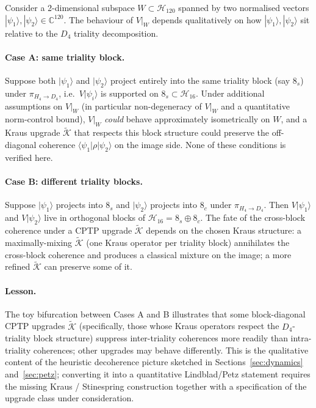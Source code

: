 \documentclass[12pt]{article}
\theoremstyle{definition}
\theoremstyle{remark}
\newcommand{\Hcal}{\mathcal{H}}
\newcommand{\Kcal}{\mathcal{K}}
\begin{document}
Consider a 2-dimensional subspace $W \subset \Hcal_{120}$ spanned by two normalised vectors $|\psi_1\rangle, |\psi_2\rangle \in \mathbb{C}^{120}$. The behaviour of $V|_W$ depends qualitatively on how $|\psi_1\rangle, |\psi_2\rangle$ sit relative to the $D_4$ triality decomposition.

\paragraph{Case A: same triality block.} Suppose both $|\psi_1\rangle$ and $|\psi_2\rangle$ project entirely into the same triality block (say $8_s$) under $\pi_{H_4 \to D_4}$, i.e.\ $V|\psi_i\rangle$ is supported on $8_s \subset \Hcal_{16}$. Under additional assumptions on $V|_W$ (in particular non-degeneracy of $V|_W$ and a quantitative norm-control bound), $V|_W$ \emph{could} behave approximately isometrically on $W$, and a Kraus upgrade $\widetilde{\Kcal}$ that respects this block structure could preserve the off-diagonal coherence $\langle\psi_1|\rho|\psi_2\rangle$ on the image side. None of these conditions is verified here.

\paragraph{Case B: different triality blocks.} Suppose $|\psi_1\rangle$ projects into $8_s$ and $|\psi_2\rangle$ projects into $8_c$ under $\pi_{H_4 \to D_4}$. Then $V|\psi_1\rangle$ and $V|\psi_2\rangle$ live in orthogonal blocks of $\Hcal_{16} = 8_s \oplus 8_c$. The fate of the cross-block coherence under a CPTP upgrade $\widetilde{\Kcal}$ depends on the chosen Kraus structure: a maximally-mixing $\widetilde{\Kcal}$ (one Kraus operator per triality block) annihilates the cross-block coherence and produces a classical mixture on the image; a more refined $\widetilde{\Kcal}$ can preserve some of it.

\paragraph{Lesson.} The toy bifurcation between Cases A and B illustrates that some block-diagonal CPTP upgrades $\widetilde{\Kcal}$ (specifically, those whose Kraus operators respect the $D_4$-triality block structure) suppress inter-triality coherences more readily than intra-triality coherences; other upgrades may behave differently. This is the qualitative content of the heuristic decoherence picture sketched in Sections~\ref{sec:dynamics} and~\ref{sec:petz}; converting it into a quantitative Lindblad/Petz statement requires the missing Kraus / Stinespring construction together with a specification of the upgrade class under consideration.
\end{document}
